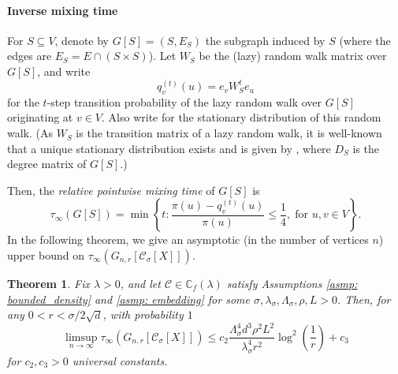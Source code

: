 \documentclass{article}
\newcommand{\set}[1]{\left\{#1\right\}}
\newcommand{\vol}{\mathrm{vol}}
\newcommand{\1}{\mathbf{1}}
\newcommand{\Xbf}{X}             %
\newcommand{\Wbf}{W}
\newcommand{\Dbf}{D}
\newcommand{\Cbb}{\mathbb{C}}
\newcommand{\Cset}{\mathcal{C}}
\newcommand{\Csig}{\Cset_{\sigma}}
\theoremstyle{aldenthm}
\newtheorem{theorem}{Theorem}
\theoremstyle{aldenrmrk}
\begin{document}
\paragraph{Inverse mixing time}
For $S \subseteq V$, denote by $G[S] = (S, E_S)$ the subgraph induced by 
$S$ (where the edges are $E_S = E \cap (S \times S)$). Let $\Wbf_S$ be the (lazy) random walk matrix over $G[S]$, and write 
$$
q_{v}^{(t)}(u) = e_v\Wbf_S^t e_u
$$
for the $t$-step transition probability of the lazy random walk over $G[S]$
originating at $v \in V$. Also write 
for the stationary distribution of this random walk.  (As
$\Wbf_S$ is the transition matrix of a lazy random walk, it is well-known that a unique stationary distribution exists and is given by
\smash{$\pi(u) = (\Dbf_S)_{uu}/\vol(S; G[S])$}, where $\Dbf_S$ is the degree matrix of $G[S]$.)

Then, the \emph{relative pointwise mixing time} of $G[S]$ is 
\begin{equation}
\label{eqn: mixing_time}
\tau_{\infty}(G[S]) = \min\set{ t: \frac{\pi(u) - q_{v}^{(t)}(u)
	}{\pi(u)} \leq \frac{1}{4}, 
	\; \text{for $u,v \in V$}}. 
\end{equation}
In the following theorem, we give an asymptotic (in the number of vertices $n$) upper bound on $\tau_{\infty}(G_{n,r}[\Csig[\Xbf]])$.

\begin{theorem}
	\label{thm: mixing_time_upper_bound}
	Fix $\lambda > 0$, and let $\Cset \in \Cbb_f(\lambda)$ satisfy Assumptions \ref{asmp: bounded_density} and \ref{asmp: embedding} for some $\sigma, \lambda_{\sigma}, \Lambda_{\sigma}, \rho, L > 0$. Then, for any $0 < r < \sigma/2\sqrt{d}$, with probability $1$
	\begin{equation}
	\label{eqn: mixing_time_upper_bound}
	\limsup_{n \to \infty}\tau_{\infty}(G_{n,r}[\Csig[\Xbf]]) \leq c_2 \frac{\Lambda_{\sigma}^4 d^3 \rho^2 L^2}{\lambda_{\sigma}^4 r^2} \log^2\left(\frac{1}{r}\right) + c_3
	\end{equation}
	for $c_2,c_3 > 0$ universal constants. 
\end{theorem}
\end{document}
